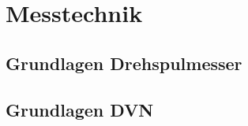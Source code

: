 \documentclass[a4paper, 11pt]{article}
\begin{document}
\section{Messtechnik}

\subsection{Grundlagen Drehspulmesser}


\subsection{Grundlagen DVN}

\end{document}
